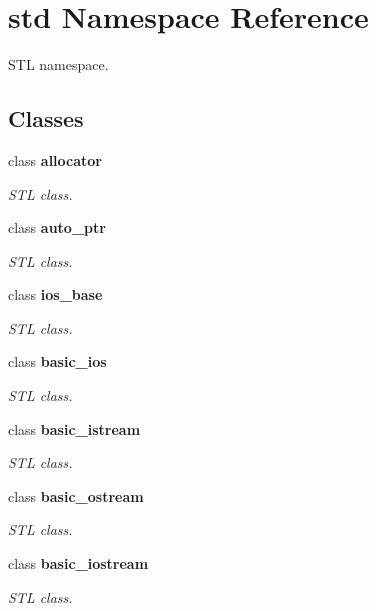 \section{std Namespace Reference}
\label{namespacestd}
STL namespace.  


\subsection*{Classes}
\begin{CompactItemize}
\item 
class \textbf{allocator}
\begin{CompactList}\small\item\em STL class. \item\end{CompactList}\item 
class \textbf{auto\_\-ptr}
\begin{CompactList}\small\item\em STL class. \item\end{CompactList}\item 
class \textbf{ios\_\-base}
\begin{CompactList}\small\item\em STL class. \item\end{CompactList}\item 
class \textbf{basic\_\-ios}
\begin{CompactList}\small\item\em STL class. \item\end{CompactList}\item 
class \textbf{basic\_\-istream}
\begin{CompactList}\small\item\em STL class. \item\end{CompactList}\item 
class \textbf{basic\_\-ostream}
\begin{CompactList}\small\item\em STL class. \item\end{CompactList}\item 
class \textbf{basic\_\-iostream}
\begin{CompactList}\small\item\em STL class. \item\end{CompactList}\item 

\end{CompactItemize}
